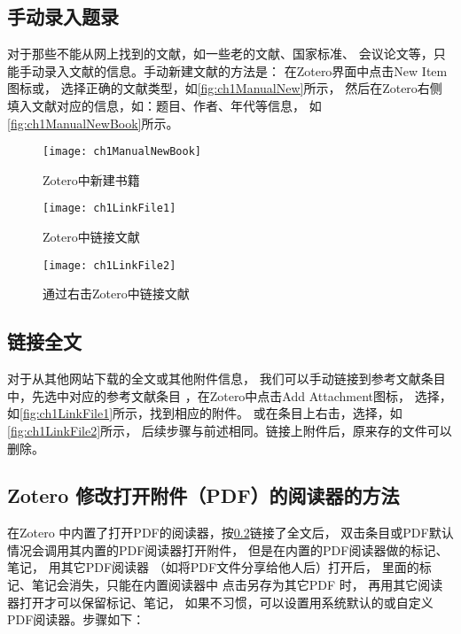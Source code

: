 \documentclass[theorem=false,mathfont=none,openany,sub3section]{easybook}
\begin{document}
\subsection{手动录入题录}\label{sec:ManualImport}
对于那些不能从网上找到的文献，如一些老的文献、国家标准、
会议论文等，只能手动录入文献的信息。手动新建文献的方法是：
在Zotero界面中点击New Item图标或，
选择正确的文献类型，如\autoref{fig:ch1ManualNew}所示，
然后在Zotero右侧填入文献对应的信息，如：题目、作者、年代等信息，
如\autoref{fig:ch1ManualNewBook}所示。
\begin{figure}
	\centering
	\begin{minipage}[t]{\dimexpr0.5\textwidth-4em}
		\centering
		\texttt{[image: ch1ManualNewBook]}
		\caption{Zotero中新建书籍}
		\label{fig:ch1ManualNewBook}
	\end{minipage}	
	\hspace{2cm}
	\begin{minipage}[t]{\dimexpr0.5\textwidth-4em}
		\centering
		\texttt{[image: ch1LinkFile1]}
		\caption{Zotero中链接文献}
		\label{fig:ch1LinkFile1}
	\end{minipage}	
\end{figure}
\begin{figure}
	\centering
	\texttt{[image: ch1LinkFile2]}
	\caption{通过右击Zotero中链接文献}
	\label{fig:ch1LinkFile2}
\end{figure}


\subsection{链接全文}\label{sec:linkFulltex}
对于从其他网站下载的全文或其他附件信息，
我们可以手动链接到参考文献条目中，先选中对应的参考文献条目
，在Zotero中点击Add Attachment图标，
选择，
如\autoref{fig:ch1LinkFile1}所示，找到相应的附件。
或在条目上右击，选择，如\autoref{fig:ch1LinkFile2}所示，
后续步骤与前述相同。链接上附件后，原来存的文件可以删除。

\subsection{Zotero 修改打开附件（PDF）的阅读器的方法}\label{sec:chang_pdf_browser}

在Zotero 中内置了打开PDF的阅读器，按\cref{sec:linkFulltex}链接了全文后，
双击条目或PDF默认情况会调用其内置的PDF阅读器打开附件，
但是在内置的PDF阅读器做的标记、笔记，
用其它PDF阅读器
（如将PDF文件分享给他人后）打开后，
里面的标记、笔记会消失，只能在内置阅读器中
点击另存为其它PDF
时，
再用其它阅读器打开才可以保留标记、笔记，
如果不习惯，可以设置用系统默认的或自定义PDF阅读器。步骤如下：
\end{document}
